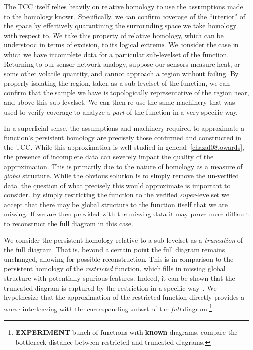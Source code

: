 The TCC itself relies heavily on relative homology to use the assumptions made to the homology known.
Specifically, we can confirm coverage of the ``interior'' of the space by effectively quarantining the surrounding space we take homology with respect to.
We take this property of relative homology, which can be understood in terms of excision, to its logical extreme.
We consider the case in which we have incomplete data for a particular sub-levelset of the function.
Returning to our sensor network analogy, suppose our sensors measure heat, or some other volatile quantity, and cannot approach a region without failing.
By properly isolating the region, taken as a sub-levelset of the function, we can confirm that the sample we have is topologically representative of the region near, and above this sub-levelset.
We can then re-use the same machinery that was used to verify coverage to analyze a \emph{part} of the function in a very specific way.

In a superficial sense, the assumptions and machinery required to approximate a function's persistent homology are precisely those confirmed and constructed in the TCC. %
While this approximation is well studied in general~\ref{chazal08towards}, the presence of incomplete data can severely impact the quality of the approximation.
This is primarily due to the nature of homology as a measure of \emph{global} structure.
While the obvious solution is to simply remove the un-verified data, the question of what precisely this would approximate is important to consider.
By simply restricting the function to the verified \emph{super}-levelset we accept that there may be global structure to the function itself that we are missing.
If we are then provided with the missing data it may prove more difficult to reconstruct the full diagram in this case.


We consider the persistent homology relative to a sub-levelset as a \emph{truncation} of the full diagram.
That is, beyond a certain point the full diagram remains unchanged, allowing for possible reconstruction.
This is in comparison to the persistent homology of the \emph{restricted} function, which fills in missing global structure with potentially spurious features.
Indeed, it can be shown that the truncated diagram is captured by the restriction in a specific way~\cite{extendedpersistence}.
We hypothesize that the approximation of the restricted function directly provides a worse interleaving with the corresponding subset of the \emph{full} diagram.\footnote{\textbf{EXPERIMENT} bunch of functions with \textbf{known} diagrams. compare the bottleneck distance between restricted and truncated diagrams.}

